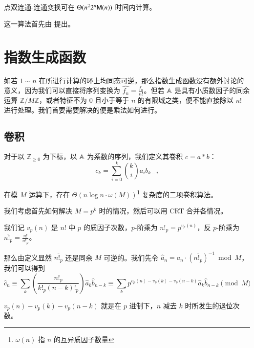 \begin{theorem}
点双连通-连通变换可在 $\Theta(n^22^n\mathsf M(n))$ 时间内计算。
\end{theorem}

这一算法首先由 \cite{b2c} 提出。

\section{指数生成函数}

如若 $1\sim n$ 在所进行计算的环上均同态可逆，那么指数生成函数没有额外讨论的意义，因为我们可以直接将序列变换为 $\widehat {f_n} = \frac {f_n}{n!}$。但若 $\mathbb A$ 是具有小质数因子的同余运算 $\mathbb Z/M\mathbb Z$，或者特征不为 $0$ 且小于等于 $n$ 的有限域之类，便不能直接除以 $n!$ 进行处理。我们首要需要解决的便是乘法如何进行。

\subsection{卷积}

\begin{definition}[二项卷积]
对于以 $\mathbb Z_{\ge 0}$ 为下标，以 $\mathbb A$ 为系数的序列，我们定义其卷积 $c = a * b$：
$$
c_k = \sum_{i = 0}^k \binom k i a_i b_{k-i}
$$
\end{definition}

\begin{theorem}
在模 $M$ 运算下，存在 $\Theta(n\log n \cdot \omega(M))$\footnote{$\omega(n)$ 指 $n$ 的互异质因子数量} 复杂度的二项卷积算法。
\end{theorem}

我们考虑首先如何解决 $M = p^k$ 时的情况，然后可以用 CRT 合并各情况。

我们记 $v_p(n)$ 是 $n!$ 中 $p$ 的质因子次数，$p$-阶乘为 $n!_p = p^{v_p(n)}$，反 $p$-阶乘为 $\overline{n!_p} = \frac{n!}{n!_p}$。

那么由定义显然 $\overline{n!_p}$ 还是同余 $M$ 可逆的。我们先令 $\widehat a_n = a_n \cdot \left( \overline{n!_p} \right)^{-1} \bmod M$，我们可以得到
$$
\widehat c_n \equiv \sum_k \left(\frac{n!_p}{k!_p (n-k)!_p}\right) \widehat a_k \widehat b_{n-k} \equiv \sum_k p^{v_p(n)-v_p(k)-v_p(n-k)} \widehat a_k \widehat b_{n-k} \pmod M
$$

\begin{theorem}[Kummer]

$v_p(n)-v_p(k)-v_p(n-k)$ 就是在 $p$ 进制下，$n$ 减去 $k$ 时所发生的退位次数。

\end{theorem}

